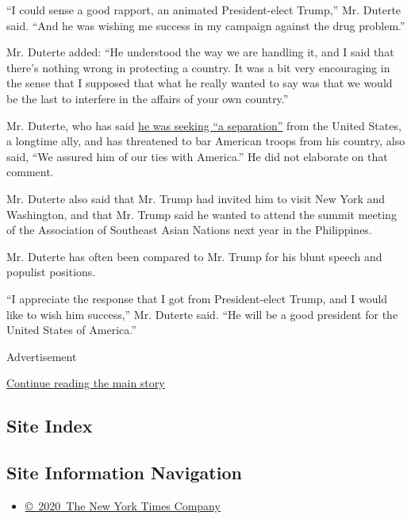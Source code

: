 ``I could sense a good rapport, an animated President-elect Trump,'' Mr.
Duterte said. ``And he was wishing me success in my campaign against the
drug problem.''

Mr. Duterte added: ``He understood the way we are handling it, and I
said that there's nothing wrong in protecting a country. It was a bit
very encouraging in the sense that I supposed that what he really wanted
to say was that we would be the last to interfere in the affairs of your
own country.''

Mr. Duterte, who has said
\href{http://www.nytimes.com/2016/10/25/world/asia/rodrigo-duterte-philippines-china.html}{he
was seeking ``a separation''} from the United States, a longtime ally,
and has threatened to bar American troops from his country, also said,
``We assured him of our ties with America.'' He did not elaborate on
that comment.

Mr. Duterte also said that Mr. Trump had invited him to visit New York
and Washington, and that Mr. Trump said he wanted to attend the summit
meeting of the Association of Southeast Asian Nations next year in the
Philippines.

Mr. Duterte has often been compared to Mr. Trump for his blunt speech
and populist positions.

``I appreciate the response that I got from President-elect Trump, and I
would like to wish him success,'' Mr. Duterte said. ``He will be a good
president for the United States of America.''

Advertisement

\protect\hyperlink{after-bottom}{Continue reading the main story}

\hypertarget{site-index}{%
\subsection{Site Index}\label{site-index}}

\hypertarget{site-information-navigation}{%
\subsection{Site Information
Navigation}\label{site-information-navigation}}

\begin{itemize}
\tightlist
\item
  \href{https://help.nytimes.com/hc/en-us/articles/115014792127-Copyright-notice}{©~2020~The
  New York Times Company}
\end{itemize}

